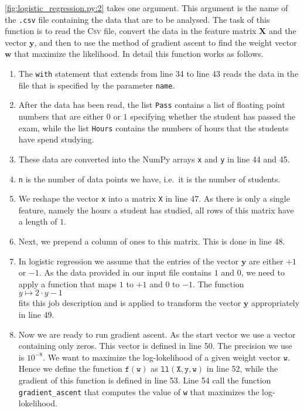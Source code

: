 \begin{enumerate}
      \ref{fig:logistic_regression.py:2} takes one argument.  This argument
      is the name of the \texttt{.csv} file containing the data that are to be analysed.  
      The task of this function is to read the \textsc{Csv} file, convert the data in the feature matrix
      $\mathbf{X}$ and the vector $\mathbf{y}$, and then to use the method of gradient ascent to find the weight vector
      $\mathbf{w}$ that maximize the likelihood.  In detail this function works as follows.
      \begin{enumerate}
      \item The \texttt{with} statement that extends from line 34 to line 43 reads the data in the file that
            is specified by the parameter \texttt{name}.
      \item After the data has been read, the list \texttt{Pass} contains a list of floating point numbers that
            are either $0$ or $1$ specifying whether the student has passed the exam, while the list
            \texttt{Hours} contains the numbers of hours that the students have spend studying.
      \item These data are converted into the NumPy arrays \texttt{x} and \texttt{y} in line 44 and 45.
      \item \texttt{n} is the number of data points we have, i.e.~it is the number of students.
      \item We reshape the vector \texttt{x} into a matrix \texttt{X} in line 47.
            As there is only a single feature, namely the hours a student has studied, all rows of this matrix
            have a length of $1$. 
      \item Next, we prepend a column of ones to this matrix.  This is done in line 48.
      \item In logistic regression we assume that the entries of the vector $\mathbf{y}$ are either $+1$ or
            $-1$.  As the data provided in our input file contains $1$ and $0$, we need to apply a function that maps $1$ to $+1$ and $0$ to $-1$.
            The function
            \\[0.2cm]
            \hspace*{1.3cm}
            $y \mapsto 2 \cdot y - 1$
            \\[0.2cm]
            fits this job description and is applied to transform the vector $\mathbf{y}$ appropriately in line
            49.
      \item Now we are ready to run gradient ascent.  As the start vector we use a vector containing only
            zeros.  This vector is defined in line 50.  The precision we use is $10^{-8}$.
            We want to maximize the log-lokelihood of a given weight vector $\mathtt{w}$.  Hence we define the
            function $\texttt{f}(\texttt{w})$ as $\mathtt{ll}(\mathtt{X}, \mathtt{y}, \mathtt{w})$ in line 52,
            while the gradient of this function is defined in line 53.
            Line 54 call the function \texttt{gradient\_ascent} that computes the value of \texttt{w} that
            maximizes the log-lokelihood.            
      \end{enumerate}
\end{enumerate}

